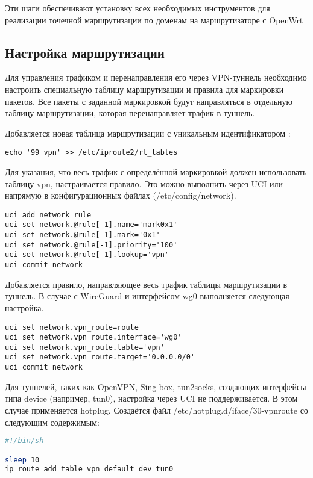 Эти шаги обеспечивают установку всех необходимых инструментов для реализации точечной маршрутизации по доменам на маршрутизаторе с OpenWrt

\subsection{Настройка маршрутизации}

Для управления трафиком и перенаправления его через VPN-туннель необходимо настроить специальную таблицу маршрутизации и правила для маркировки пакетов. Все пакеты с заданной маркировкой будут направляться в отдельную таблицу маршрутизации, которая перенаправляет трафик в туннель.

Добавляется новая таблица маршрутизации с уникальным идентификатором \cite{openwrt}:

\begin{lstlisting}[frame=rlbt]
echo '99 vpn' >> /etc/iproute2/rt_tables
\end{lstlisting}

Для указания, что весь трафик с определённой маркировкой должен использовать таблицу vpn, настраивается правило. Это можно выполнить через UCI или напрямую в конфигурационных файлах (/etc/config/network).

\begin{lstlisting}[frame=rlbt]
uci add network rule
uci set network.@rule[-1].name='mark0x1'
uci set network.@rule[-1].mark='0x1'
uci set network.@rule[-1].priority='100'
uci set network.@rule[-1].lookup='vpn'
uci commit network
\end{lstlisting}

Добавляется правило, направляющее весь трафик таблицы маршрутизации в туннель. В случае с WireGuard и интерфейсом wg0 выполняется следующая настройка.

\begin{lstlisting}[frame=rlbt]
uci set network.vpn_route=route
uci set network.vpn_route.interface='wg0'
uci set network.vpn_route.table='vpn'
uci set network.vpn_route.target='0.0.0.0/0'
uci commit network
\end{lstlisting}

Для туннелей, таких как OpenVPN, Sing-box, tun2socks, создающих интерфейсы типа device (например, tun0), настройка через UCI не поддерживается. В этом случае применяется hotplug. Создаётся файл /etc/hotplug.d/iface/30-vpnroute со следующим содержимым:

\begin{lstlisting}[frame=rlbt,language=bash]
#!/bin/sh

sleep 10
ip route add table vpn default dev tun0
\end{lstlisting}

